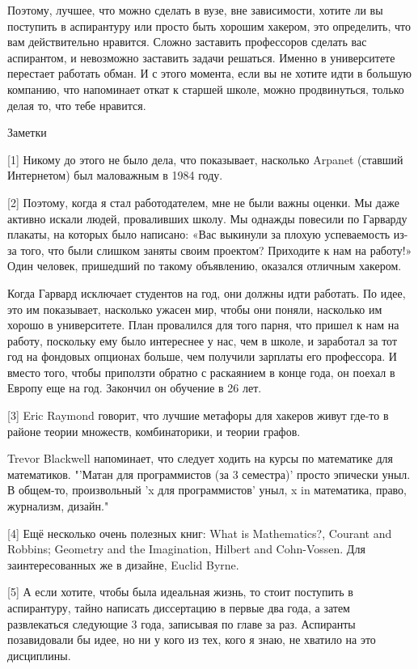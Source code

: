 \documentclass[ebook,12pt,oneside,openany]{memoir}
\begin{document}
Поэтому, лучшее, что можно сделать в вузе, вне зависимости, хотите ли
вы поступить в аспирантуру или просто быть хорошим хакером, это
определить, что вам действительно нравится. Сложно заставить
профессоров сделать вас аспирантом, и невозможно заставить задачи
решаться. Именно в университете перестает работать обман. И с этого
момента, если вы не хотите идти в большую компанию, что напоминает
откат к старшей школе, можно продвинуться, только делая то, что тебе
нравится.

Заметки

[1] Никому до этого не было дела, что показывает, насколько Arpanet
(ставший Интернетом) был маловажным в 1984 году.

[2] Поэтому, когда я стал работодателем, мне не были важны оценки. Мы
даже активно искали людей, проваливших школу. Мы однажды повесили по
Гарварду плакаты, на которых было написано: «Вас выкинули за плохую
успеваемость из-за того, что были слишком заняты своим проектом?
Приходите к нам на работу!» Один человек, пришедший по такому
объявлению, оказался отличным хакером.

Когда Гарвард исключает студентов на год, они должны идти работать. По
идее, это им показывает, насколько ужасен мир, чтобы они поняли,
насколько им хорошо в университете. План провалился для того парня,
что пришел к нам на работу, поскольку ему было интереснее у нас, чем в
школе, и заработал за тот год на фондовых опционах больше, чем
получили зарплаты его профессора. И вместо того, чтобы приползти
обратно с раскаянием в конце года, он поехал в Европу еще на год.
Закончил он обучение в 26 лет.

[3] Eric Raymond говорит, что лучшие метафоры для хакеров живут где-то
в районе теории множеств, комбинаторики, и теории графов.

Trevor Blackwell напоминает, что следует ходить на курсы по математике
для математиков. "'Матан для программистов (за 3 семестра)' просто
эпически уныл. В общем-то, произвольный 'x для программистов' уныл, x
in {математика, право, журнализм, дизайн}."

[4] Ещё несколько очень полезных книг: What is Mathematics?, Courant
and Robbins; Geometry and the Imagination, Hilbert and Cohn-Vossen.
Для заинтересованных же в дизайне, Euclid Byrne.

[5] А если хотите, чтобы была идеальная жизнь, то стоит поступить в
аспирантуру, тайно написать диссертацию в первые два года, а затем
развлекаться следующие 3 года, записывая по главе за раз. Аспиранты
позавидовали бы идее, но ни у кого из тех, кого я знаю, не хватило на
это дисциплины.
\end{document}

